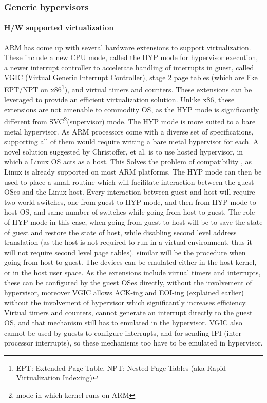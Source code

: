 \documentclass[seminar,twoside]{iitbreport}
\begin{document}
  \subsubsection{Generic hypervisors}
  
  \paragraph{H/W supported virtualization}

  ARM has come up with several hardware extensions to support virtualization. These include a new CPU mode, called the HYP mode for hypervisor execution,
  a newer interrupt controller to accelerate handling of interrupts in guest, called VGIC (Virtual Generic Interrupt Controller), stage 2 page tables (which are like EPT/NPT on x86\footnote{EPT: Extended Page Table, NPT: Nested Page Tables (aka Rapid Virtualization Indexing)}),
  and virtual timers and counters. 
  These extensions can be leveraged to provide an efficient virtualization solution. Unlike x86, these extensions are not amenable to commodity OS, as the HYP mode is significantly
  different from SVC\footnote{mode in which kernel runs on ARM}(supervisor)  mode.
  The HYP mode is more suited to a bare metal hypervisor. As ARM processors come with a diverse set of specifications, supporting all of them would require
  writing a bare metal hypervisor for each. A novel solution suggested by Christoffer, et al. \cite{Dall:2014:KDI:2541940.2541946} is to use hosted hypervisor, in which
  a Linux OS acts as a host. This Solves the problem of compatibility , as Linux is already supported on most ARM platforms.
  The HYP mode can then be used to place a small routine which will facilitate interaction between the guest OSes and the Linux host.
  Every interaction between guest and host will require two world switches, one from guest to HYP mode, and then from HYP mode to host OS, and same number of switches while going 
  from host to guest. The role of HYP mode in this case, when going from guest to host will be to save the state of guest and restore the state of host, while disabling second level address translation
  (as the host is not required to run in a virtual environment, thus it will not require second level page tables). similar will be the procedure when going from host to guest.
  The devices can be emulated either in the host kernel, or in the host user space. As the extensions include virtual timers and interrupts, these can be configured by the
  guest OSes directly, without the involvement of hypervisor, moreover VGIC allows ACK-ing and EOI-ing (explained earlier) without the involvement of hypervisor which
  significantly increases efficiency. Virtual timers and counters, cannot generate an interrupt directly to the guest OS, and that mechanism still has to emulated in the
  hypervisor. VGIC also cannot be used by guests to configure interrupts, and for sending IPI (inter processor interrupts), so these mechanisms too have to be
  emulated in hypervisor.
  
\end{document}

